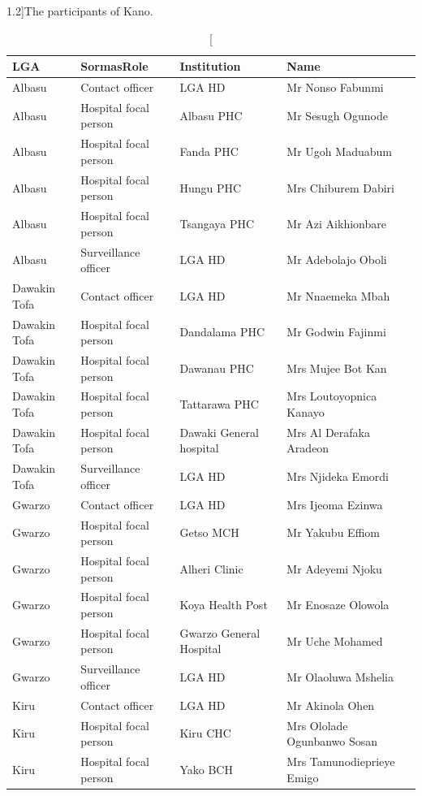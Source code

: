 \documentclass[a4paper, titlepage]{tufte-handout}
\begin{document}
\begin{table}\footnotesize
\caption[The participants of Kano.][1.2\baselineskip]{The participants of Kano.}\label{tab:user-kano}
\begin{tabular}{l|l|l|l}
\toprule
LGA & SormasRole & Institution & Name\\
\midrule
Albasu & Contact officer & LGA HD & Mr Nonso Fabunmi\\
Albasu & Hospital focal person & Albasu PHC & Mr Sesugh Ogunode\\
Albasu & Hospital focal person & Fanda PHC & Mr Ugoh Maduabum\\
Albasu & Hospital focal person & Hungu PHC & Mrs Chiburem Dabiri\\
Albasu & Hospital focal person & Tsangaya PHC & Mr Azi Aikhionbare\\
Albasu & Surveillance officer & LGA HD & Mr Adebolajo Oboli\\
Dawakin Tofa & Contact officer & LGA HD & Mr Nnaemeka Mbah\\
Dawakin Tofa & Hospital focal person & Dandalama PHC & Mr Godwin Fajinmi\\
Dawakin Tofa & Hospital focal person & Dawanau PHC & Mrs Mujee Bot Kan\\
Dawakin Tofa & Hospital focal person & Tattarawa PHC & Mrs Loutoyopnica Kanayo\\
Dawakin Tofa & Hospital focal person & Dawaki General hospital & Mrs Al Derafaka Aradeon\\
Dawakin Tofa & Surveillance officer & LGA HD & Mrs Njideka Emordi\\
Gwarzo & Contact officer & LGA HD & Mrs Ijeoma Ezinwa\\
Gwarzo & Hospital focal person & Getso MCH & Mr Yakubu Effiom\\
Gwarzo & Hospital focal person & Alheri Clinic & Mr Adeyemi Njoku\\
Gwarzo & Hospital focal person & Koya Health Post & Mr Enosaze Olowola\\
Gwarzo & Hospital focal person & Gwarzo General Hospital & Mr Uche Mohamed\\
Gwarzo & Surveillance officer & LGA HD & Mr Olaoluwa Mshelia\\
Kiru & Contact officer & LGA HD & Mr Akinola Ohen\\
Kiru & Hospital focal person & Kiru CHC & Mrs Ololade Ogunbanwo Sosan\\
Kiru & Hospital focal person & Yako BCH & Mrs Tamunodieprieye Emigo\\

\end{tabular}
\end{table}
\end{document}
